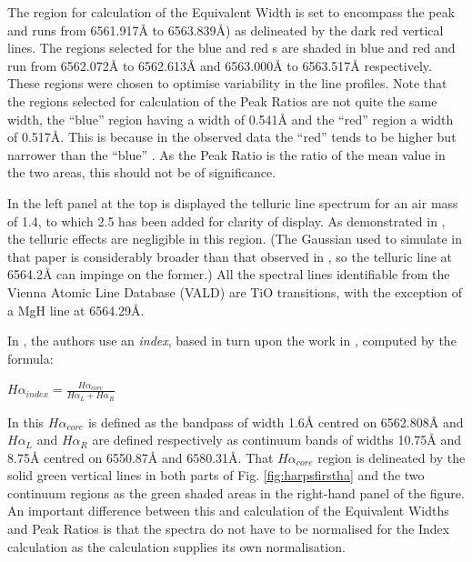 The {\ha} region for calculation of the Equivalent Width is set to encompass the {\ha} peak and runs from 6561.917{\AA}
to 6563.839\AA) as delineated by the dark red vertical lines. The regions selected for the blue and red \horn s are
shaded in blue and red and run from 6562.072{\AA} to 6562.613{\AA} and 6563.000{\AA} to 6563.517{\AA}
respectively. These regions were chosen to optimise variability in the line profiles. Note that the regions selected for
calculation of the Peak Ratios are not quite the same width, the ``blue'' {\horn} region having a width of 0.541{\AA}
and the ``red'' {\horn} region a width of 0.517\AA. This is because in the observed data the ``red'' {\horn} tends to be
higher but narrower than the ``blue'' \horn. As the Peak Ratio is the ratio of the mean value in the two areas, this
should not be of significance.

In the left panel at the top is displayed the telluric line spectrum for an air mass of 1.4, to which 2.5 has been added
for clarity of display. As demonstrated in \citet[Fig. 1]{reiners15}, the telluric effects are negligible in this
region. (The Gaussian used to simulate {\ha} in that paper is considerably broader than that observed in \prox, so the
telluric line at 6564.2{\AA} can impinge on the former.) All the spectral lines identifiable from the Vienna Atomic Line
Database (VALD) are TiO transitions, with the exception of a MgH line at 6564.29\AA.

In \citet{suarezmascareno15}, the authors use an \textit{{\ha} index}, based in turn upon the work in
\citet{gomesdasilva11}, computed by the formula:

\begin{center}

$ H\alpha_{index} = \frac{H\alpha_{core}}{H\alpha_L + H\alpha_R} $

\end{center}

In this $ H\alpha_{core} $ is defined as the bandpass of width 1.6{\AA} centred on 6562.808{\AA} and $ H\alpha_L $ and
$H \alpha_R $ are defined respectively as continuum bands of widths 10.75{\AA} and 8.75{\AA} centred on 6550.87{\AA} and
6580.31\AA. That $ H\alpha_{core} $ region is delineated by the solid green vertical lines in both parts of
Fig. \ref{fig:harpsfirstha} and the two continuum regions as the green shaded areas in the right-hand panel of the
figure. An important difference between this and calculation of the Equivalent Widths and Peak Ratios is that the
spectra do not have to be normalised for the {\ha} Index calculation as the calculation supplies its own normalisation.


